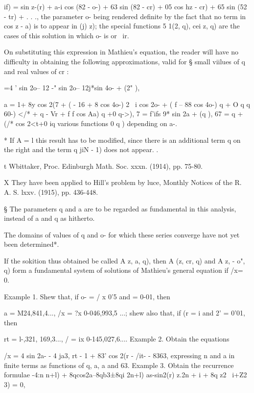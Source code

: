 {{  if) = sin z-(r) + a-i cos (82 - o-) + 63 sin (82 - cr) + 05 cos hz -
cr) + 65 sin (52 - tr) + . . ., the parameter o- being rendered
definite by the fact that no term in cos z - a) is to appear in (j)
z); the special functions 5 1(2, q), cei z, q) are the cases of this
solution in which o- is or \ ir.

On substituting this expression in Mathieu's equation, the reader will
have no difficulty in obtaining the following approximations, valid
for § small viilues of q and real values of cr :

  =4 ' sin 2o-- 12 -" sin 2o-- 12j*sin 4o- + (2" ),

a = 1+ 8y cos 2(7 + ( - 16 + 8 cos 4o-) 2 \ i cos 2o- + ( f -- 88 cos
4o-) q + O q%
q%
60-) </* + q%
- Vr + f f cos Aa) q +0 q->), 7 = f'ifs 9* sin 2a + (q ), 67 = q + (/*
cos 2<t+0 iq%
various functions 0 q ) depending on a-.

* If A = l this result has to be modified, since there is an
additional term q on the right and the term q jiN - 1) does not
appear. .

t Wbittaker, Proc. Edinburgh Math. Soc. xxxn. (1914), pp. 75-80.

X They have been applied to Hill's problem by luce, Monthly Notices of
the R. A. S. lxxv. (1915), pp. 436-448.

§ The parameters q and a are to be regarded as fundamental in this
analysis, instead of a and q as hitherto.

%
%

The domains of values of q and o- for which these series converge have
not yet been determined*.

If the sokition thus obtained be called A z, a, q), then A (z, cr, q)
and A z, - o", q) form a fundamental system of solutions of Mathieu's
general equation if /x= 0.

Example 1. Shew that, if o- = / x 0'5 and = 0-01, then

a = M24,841,4..., /x = ?x 0-046,993,5 ...; shew also that, if (r = i
and 2' = 0'01, then

rt = l-,321, 169,3..., / = ix 0-145,027,6.... Example 2. Obtain the
equations

/x = 4 sin 2a- - 4 ja3, rt - 1 + 83' cos 2(r - /it- - 8363,
expressing n and a in finite terms as functions of q, a, a and 63.
Example 3. Obtain the recurrence formulae -4:n n+l) +
8qcos2a--8qb3±8qi 2n+l) as-sin2(r) z.2n + i + 8q z2 \ i+Z2 3) = 0,

}}
